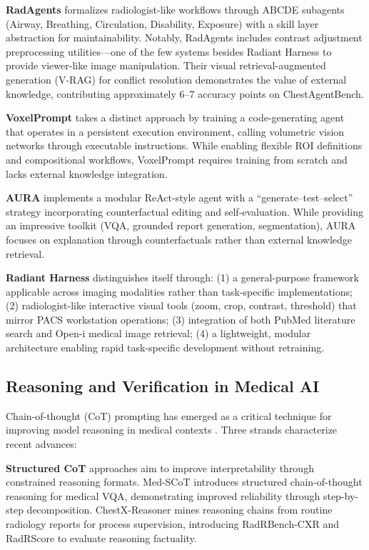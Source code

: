 \documentclass[11pt]{article}
\begin{document}
\textbf{RadAgents} \citep{radagents2025} formalizes radiologist-like workflows through ABCDE subagents (Airway, Breathing, Circulation, Disability, Exposure) with a skill layer abstraction for maintainability. Notably, RadAgents includes contrast adjustment preprocessing utilities---one of the few systems besides Radiant Harness to provide viewer-like image manipulation. Their visual retrieval-augmented generation (V-RAG) for conflict resolution demonstrates the value of external knowledge, contributing approximately 6--7 accuracy points on ChestAgentBench.

\textbf{VoxelPrompt} \citep{hoopes2024voxelprompt} takes a distinct approach by training a code-generating agent that operates in a persistent execution environment, calling volumetric vision networks through executable instructions. While enabling flexible ROI definitions and compositional workflows, VoxelPrompt requires training from scratch and lacks external knowledge integration.

\textbf{AURA} \citep{fathi2025aura} implements a modular ReAct-style agent with a ``generate--test--select'' strategy incorporating counterfactual editing and self-evaluation. While providing an impressive toolkit (VQA, grounded report generation, segmentation), AURA focuses on explanation through counterfactuals rather than external knowledge retrieval.

\textbf{Radiant Harness} distinguishes itself through: (1) a general-purpose framework applicable across imaging modalities rather than task-specific implementations; (2) radiologist-like interactive visual tools (zoom, crop, contrast, threshold) that mirror PACS workstation operations; (3) integration of both PubMed literature search and Open-i medical image retrieval; (4) a lightweight, modular architecture enabling rapid task-specific development without retraining.

\subsection{Reasoning and Verification in Medical AI}

Chain-of-thought (CoT) prompting has emerged as a critical technique for improving model reasoning in medical contexts \citep{singhal2023large}. Three strands characterize recent advances:

\textbf{Structured CoT} approaches aim to improve interpretability through constrained reasoning formats. Med-SCoT \citep{qiao2025medscot} introduces structured chain-of-thought reasoning for medical VQA, demonstrating improved reliability through step-by-step decomposition. ChestX-Reasoner \citep{fan2025chestxreasoner} mines reasoning chains from routine radiology reports for process supervision, introducing RadRBench-CXR and RadRScore to evaluate reasoning factuality.
\end{document}
